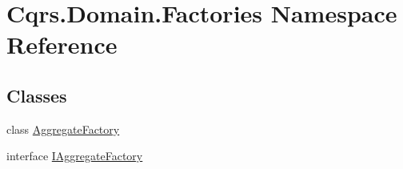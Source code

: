 \hypertarget{namespaceCqrs_1_1Domain_1_1Factories}{}\section{Cqrs.\+Domain.\+Factories Namespace Reference}
\label{namespaceCqrs_1_1Domain_1_1Factories}
\subsection*{Classes}
\begin{DoxyCompactItemize}
\item 
class \hyperlink{classCqrs_1_1Domain_1_1Factories_1_1AggregateFactory}{Aggregate\+Factory}
\item 
interface \hyperlink{interfaceCqrs_1_1Domain_1_1Factories_1_1IAggregateFactory}{I\+Aggregate\+Factory}
\end{DoxyCompactItemize}
